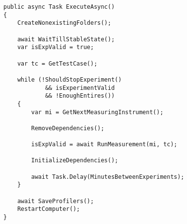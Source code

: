 
\begin{lstlisting}[caption=The method handeling dependencies and the validity of the results, label={lst:execute_async}]
public async Task ExecuteAsync()
{
    CreateNonexistingFolders();

    await WaitTillStableState();
    var isExpValid = true;

    var tc = GetTestCase();

    while (!ShouldStopExperiment() 
            && isExperimentValid 
            && !EnoughEntires())
    {
        var mi = GetNextMeasuringInstrument();

        RemoveDependencies();

        isExpValid = await RunMeasurement(mi, tc);

        InitializeDependencies();

        await Task.Delay(MinutesBetweenExperiments);
    }

    await SaveProfilers();
    RestartComputer();
}
\end{lstlisting}